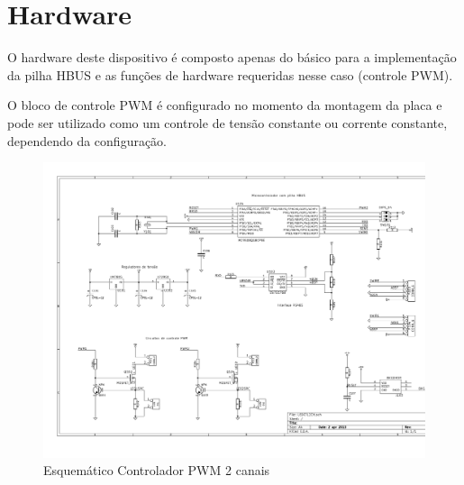 \section{Hardware}

O hardware deste dispositivo é composto apenas do básico para a implementação da pilha HBUS e as funções de hardware requeridas nesse caso (controle PWM).

O bloco de controle PWM é configurado no momento da montagem da placa e pode ser utilizado como um controle de tensão constante ou corrente constante, dependendo da configuração.


\begin{figure}[H]
\centering
\includegraphics[scale=0.75]{../media/LEDCTL2CH.pdf}
\caption{Esquemático Controlador PWM 2 canais}
\end{figure}
